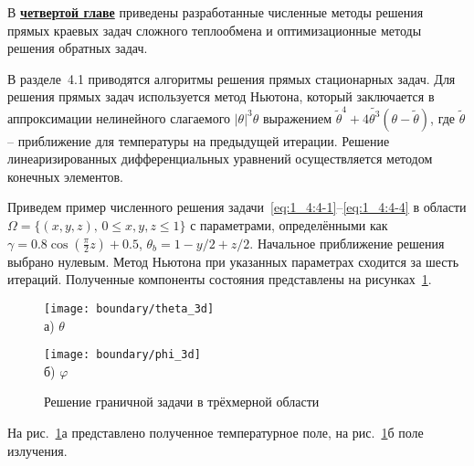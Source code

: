 В \underline{\textbf{четвертой главе}} приведены разработанные численные методы решения
прямых краевых задач сложного теплообмена и оптимизационные методы решения обратных задач.


В разделе~4.1 приводятся алгоритмы решения прямых стационарных задач.
Для решения прямых задач используется метод Ньютона, который заключается в аппроксимации
нелинейного слагаемого $|\theta|^3 \theta$
выражением $\widetilde{\theta}^4+4 \widetilde{\theta^3}(\theta-\widetilde{\theta})$,
где $\widetilde{\theta}$ --  приближение для температуры на предыдущей итерации.
Решение линеаризированных дифференциальных уравнений осуществляется методом
конечных элементов.


Приведем пример численного решения задачи~\eqref{eq:1_4:4-1}--\eqref {eq:1_4:4-4}
в области $\Omega=\{(x,y,z),\, 0 \leq x,y,z \leq 1 \}$
с параметрами, определёнными как
$\gamma = 0.8 \cos\left(\frac{\pi}{2} z\right) + 0.5$,
$\theta_b = 1- y / 2 + z /2$.
Начальное приближение решения выбрано нулевым.
Метод Ньютона при указанных параметрах сходится за шесть итераций.
Полученные компоненты состояния представлены на рисунках~\ref{fig:4_1:boundary_3d}.
\begin{figure}[h!t]
    \begin{minipage}[b][][b]{0.49\linewidth}
        \centering
        \texttt{[image: boundary/theta\_3d]} \\ а) $\theta$
    \end{minipage}
    \hfill
    \begin{minipage}[b][][b]{0.49\linewidth}
        \centering
        \texttt{[image: boundary/phi\_3d]} \\ б) $\varphi$
    \end{minipage}
    \caption{Решение граничной задачи в трёхмерной области}
    \label{fig:4_1:boundary_3d}
\end{figure}
На рис.~\ref{fig:4_1:boundary_3d}а представлено полученное температурное поле,
на рис.~\ref{fig:4_1:boundary_3d}б поле излучения.


